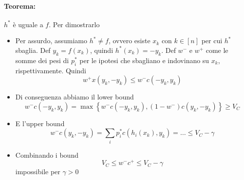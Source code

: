 \paragraph{Teorema:} $h^\ast$ è uguale a $f$. Per dimostrarlo
\begin{itemize}
	\item Per assurdo, assumiamo $h^\ast \neq f$, ovvero esiste $x_k$ con $k \in [n]$ per cui $h^\ast$ sbaglia. Def $y_k = f(x_k)$, quindi $h^\ast (x_k) = -y_k$. Def $w^-$ e $w^+$ come le somme dei pesi di $p_i^\ast$ per le ipotesi che sbagliano e indovinano su $x_k$, rispettivamente. Quindi
	$$ w^+ x (y_k, -y_k) \leq w^- c (-y_k, y_k) $$

	\item Di conseguenza abbiamo il lower bound
	$$ w^- c (-y_k, y_k) = \max \left\{w^- c (-y_k, y_k), (1 - w^-) c (y_k, -y_k)\right\} \geq V_C $$

	\item E l'upper bound
	$$ w^- c (y_k, -y_k) = \sum_{i} p_i^\ast c (h_i(x_k), y_k) = \dots \leq V_C - \gamma$$

	\item Combinando i bound
	$$ V_C \leq w^- c^+ \leq V_C - \gamma $$
	impossibile per $\gamma > 0$
\end{itemize}